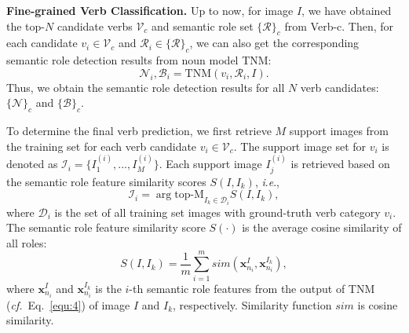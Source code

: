\documentclass[letterpaper]{article} %
\newcommand{\ie}{\textit{i}.\textit{e}.}
\newcommand{\cf}{\textit{cf.}}
\newcommand{\lc}[1]{{\color{blue}{[Long: #1]}}}
\begin{document}

\noindent\textbf{Fine-grained Verb Classification.} Up to now, for image $I$, we have obtained the top-$N$ candidate verbs $\mathcal{V}_c$ and semantic role set $\{\mathcal{R}\}_c$ from Verb-c. Then, for each candidate $v_i \in \mathcal{V}_c$ and $\mathcal{R}_i \in \{\mathcal{R}\}_c$, we can also get the corresponding semantic role detection results from noun model TNM:
\begin{equation}
    \mathcal{N}_i, \mathcal{B}_i = \text{TNM} (v_i, \mathcal{R}_i, I).
\end{equation}
Thus, we obtain the semantic role detection results for all $N$ verb candidates: $\{\mathcal{N}\}_c$ and $\{\mathcal{B}\}_c$.

To determine the final verb prediction, we first retrieve $M$ support images from the training set for each verb candidate $v_i \in \mathcal{V}_c$. The support image set for $v_i$ is denoted as $\mathcal{I}_i = \{I^{(i)}_1, ..., I^{(i)}_M \}$. Each support image $I^{(i)}_j$ is retrieved based on the semantic role feature similarity scores $S(I, I_k)$, \ie,
\begin{equation}
\mathcal{I}_i = \arg\text{top-M}_{I_k \in \mathcal{D}_i} S(I, I_k),
\end{equation}
where $\mathcal{D}_i$ is the set of all training set images with ground-truth verb category $v_i$. The semantic role feature similarity score $S(\cdot)$ is the average cosine similarity of all roles:
\begin{equation}
    S(I, I_k) = \frac{1}{m} \sum_{i=1}^{m} sim(\bm{x}_{n_i}^{I},\bm{x}_{n_i}^{I_k}),
\end{equation}
where $\bm{x}_{n_i}^{I}$ and $\bm{x}_{n_i}^{I_k}$ is the $i$-th semantic role features from the output of TNM (\cf~Eq.~\eqref{equ:4}) of image $I$ and $I_k$, respectively. Similarity function $sim$ is cosine similarity.
\end{document}
